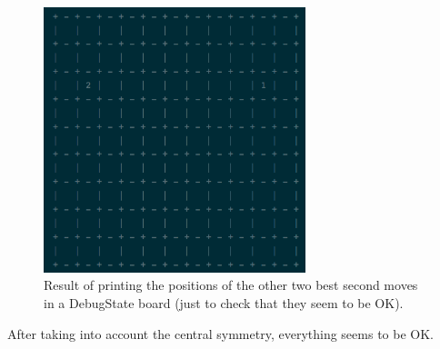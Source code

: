 \documentclass[a4paper,12pt]{article}
\begin{document}
\begin{figure}[!h]
\centering
\includegraphics[width=3.0in]{best_second_b.png}
\caption{Result of printing the positions of the other two best second moves in a DebugState board (just to check that they seem to be OK).}
\end{figure}

After taking into account the central symmetry, everything seems to be OK.
\end{document}
